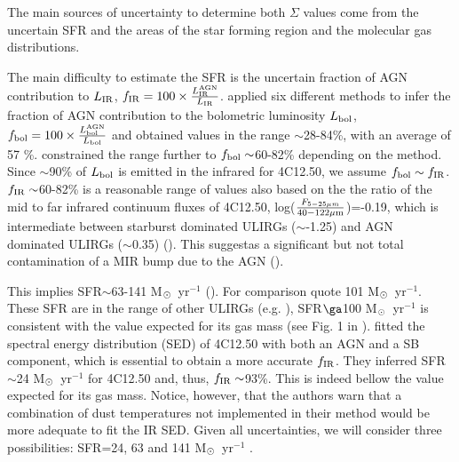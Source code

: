 \documentclass{aa}
\newcommand{\msun}{M$_{\rm \odot}$~}
\begin{document}
The main sources of uncertainty  to determine both $\Sigma$ values  come from  the  uncertain SFR and the areas of the star forming region and the molecular gas distributions.

The main difficulty to estimate the  SFR is the uncertain fraction of AGN contribution to  $L_{\rm IR}$, $f_{\rm IR}=100 \times \frac{L_{\rm IR}^{\rm AGN}}{L_{\rm IR}}$. \cite{Veilleux2009} applied six different methods to infer the fraction of AGN contribution to the bolometric luminosity $L_{\rm bol}$, $f_{\rm bol}=100 \times \frac{L_{\rm bol}^{\rm AGN}}{L_{\rm bol}}$ and obtained values in the range $\sim$28-84\%, with an average of 57 \%. \cite{Perna2021} constrained the range further to $f_{\rm bol}\sim$60-82\% depending on the method. Since $\sim$90\% of $L_{\rm bol}$ is emitted in the infrared for 4C12.50, we assume $f_{\rm bol}\sim f_{\rm IR}$. $f_{\rm IR}\sim$60-82\% is a reasonable range of values also  based on the the ratio of the mid to far infrared continuum fluxes of 4C12.50, log($\frac{F_{5-25 \mu m}}{{\rm 40-122 \mu m}}$)=-0.19, which is intermediate between  starburst dominated ULIRGs ($\sim$-1.25) and AGN  dominated ULIRGs ($\sim$0.35) (\citealt{Veilleux2009}).  This suggestas a significant but not total contamination of a MIR bump due to the AGN (\citealt{Lanz2016}).


This implies  SFR$\sim$63-141 \msun yr$^{-1}$  (\citealt{Kennicutt1998}). For comparison  \cite{Rupke2005b} quote 101 \msun yr$^{-1}$. These SFR are in  the range of other ULIRGs (e.g. \citealt{Daddi2010a,DeLooze2014,Perna2021}),  SFR$\ga$100 \msun yr$^{-1}$ is consistent with the value expected for its gas mass   (see Fig. 1 in \citealt{Daddi2010a}).
\citealt{Lanz2016} fitted the spectral energy distribution (SED) of 4C12.50 with both an AGN and a SB component, which is essential to obtain a more accurate  $f_{\rm IR}$. They inferred SFR$\sim$24 \msun yr$^{-1}$ for 4C12.50 and, thus,   $f_{\rm IR}\sim$93\%. This is indeed bellow the value expected for its gas mass. Notice, however, that the authors warn that a combination of dust temperatures not implemented in their method would be more adequate to fit the IR SED.  
Given all uncertainties, we will consider three possibilities: SFR=24, 63 and 141 \msun yr$^{-1}$ .
 
\end{document}
